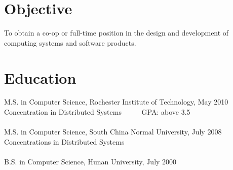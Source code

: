 \documentclass[margin]{res}
\begin{document}
 
 
 
\address{{\bf Current Address} \\ 118 East Squire Drive \#8 \\ Rochester, NY 14623 \\ }

\address{{\bf Permanent Address} \\ 1405 Hornell LN\\Smyrna, GA 30082}
 
\begin{resume} 
 
\section{Objective} 
To obtain a co-op or full-time position in the design and development of computing systems and software products.

\section{Education} 
M.S. in Computer Science, Rochester Institute of Technology, May 2010\\
Concentration in Distributed Systems ~~~~~GPA: above 3.5 \\
\\
M.S. in Computer Science, South China Normal University, July 2008\\
Concentrations in Distributed Systems \\
\\
B.S. in Computer Science, Hunan University, July 2000\\


\end{resume}
\end{document}
